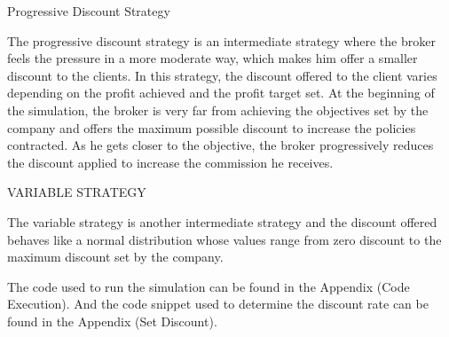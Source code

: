 \documentclass[review]{elsarticle}
\begin{document}

Progressive Discount Strategy

The progressive discount strategy is an intermediate strategy where the broker feels the pressure in a more moderate way, which makes him offer a smaller discount to the clients.
In this strategy, the discount offered to the client varies depending on the profit achieved and the profit target set.
At the beginning of the simulation, the broker is very far from achieving the objectives set by the company and offers the maximum possible discount to increase the policies contracted. As he gets closer to the objective, the broker progressively reduces the discount applied to increase the commission he receives.

VARIABLE STRATEGY

The variable strategy is another intermediate strategy and the discount offered behaves like a normal distribution whose values range from zero discount to the maximum discount set by the company.


The code used to run the simulation can be found in the Appendix (Code Execution). And the code snippet used to determine the discount rate can be found in the Appendix (Set Discount).
\end{document}
